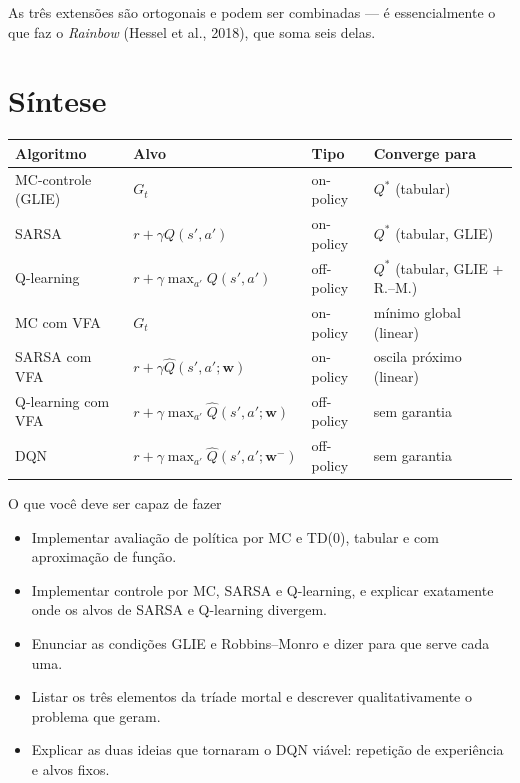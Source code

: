 \documentclass[11pt]{article}
\newcommand{\Qhat}{\widehat{Q}}
\newcommand{\wv}{\mathbf{w}}
\newcommand{\wtar}{\mathbf{w}^{-}}
\newcommand{\Qstar}{Q^{*}}
\begin{document}
As três extensões são ortogonais e podem ser combinadas --- é essencialmente o
que faz o \emph{Rainbow} (Hessel et al., 2018), que soma seis delas.

\section{Síntese}

\begin{center}\small
\begin{tabular}{llll}
  \toprule
  \textbf{Algoritmo} & \textbf{Alvo} & \textbf{Tipo} & \textbf{Converge para} \\
  \midrule
  MC-controle (GLIE) & $G_t$ & on-policy & $\Qstar$ (tabular) \\
  SARSA              & $r + \gamma Q(s',a')$ & on-policy & $\Qstar$ (tabular, GLIE) \\
  Q-learning         & $r + \gamma \max_{a'} Q(s',a')$ & off-policy & $\Qstar$ (tabular, GLIE + R.--M.) \\
  MC com VFA         & $G_t$ & on-policy & mínimo global (linear) \\
  SARSA com VFA      & $r + \gamma \Qhat(s',a';\wv)$ & on-policy & oscila próximo (linear) \\
  Q-learning com VFA & $r + \gamma \max_{a'} \Qhat(s',a';\wv)$ & off-policy & sem garantia \\
  DQN                & $r + \gamma \max_{a'} \Qhat(s',a';\wtar)$ & off-policy & sem garantia \\
  \bottomrule
\end{tabular}
\end{center}

\begin{defbox}{O que você deve ser capaz de fazer}
  \begin{itemize}[itemsep=0.1em]
    \item Implementar avaliação de política por MC e TD(0), tabular e com aproximação de função.
    \item Implementar controle por MC, SARSA e Q-learning, e explicar exatamente onde os alvos de SARSA e Q-learning divergem.
    \item Enunciar as condições GLIE e Robbins--Monro e dizer para que serve cada uma.
    \item Listar os três elementos da tríade mortal e descrever qualitativamente o problema que geram.
    \item Explicar as duas ideias que tornaram o DQN viável: repetição de experiência e alvos fixos.
  \end{itemize}
\end{defbox}
\end{document}
